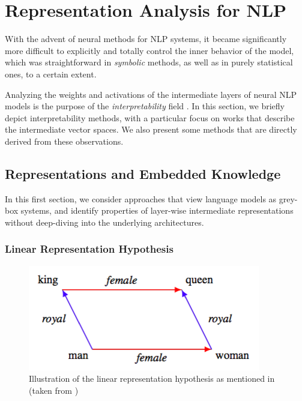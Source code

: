 \chapter{Representation Analysis for NLP}
With the advent of neural methods for NLP systems, it became significantly more difficult to explicitly and totally control the inner behavior of the model, which was straightforward in \textit{symbolic} methods, as well as in purely statistical ones, to a certain extent. 

Analyzing the weights and activations of the intermediate layers of neural NLP models is the purpose of the \textit{interpretability} field \citep{interpretability_survey}. In this section, we briefly depict interpretability methods, with a particular focus on works that describe the intermediate vector spaces. We also present some methods that are directly derived from these observations.

\section{Representations and Embedded Knowledge}
In this first section, we consider approaches that view language models as grey-box systems, and identify properties of layer-wise intermediate representations without deep-diving into the underlying architectures.

\subsection{Linear Representation Hypothesis}

\begin{figure}[ht]
    \centering
    \includegraphics[width=0.5\linewidth]{sources/related_works/imgs/parallelograms_kawin.png}
    \caption{Illustration of the linear representation hypothesis as mentioned in \citet{mikolov-etal-2013-linguistic} (taken from \citet{ethayarajh-etal-2019-towards})}
    \label{fig:parallelo}
\end{figure}

